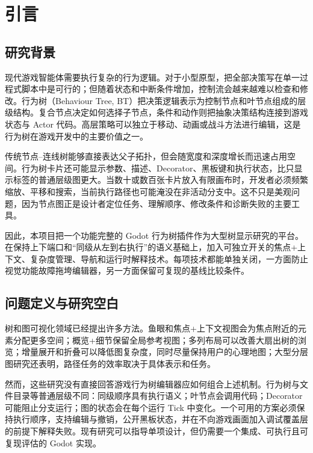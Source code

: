 \chapter{引言}
\label{ch:introduction}

\section{研究背景}

现代游戏智能体需要执行复杂的行为逻辑。对于小型原型，把全部决策写在单一过程式脚本中是可行的；但随着状态和中断条件增加，控制流会越来越难以检查和修改。行为树（Behaviour Tree, BT）把决策逻辑表示为控制节点和叶节点组成的层级结构。复合节点决定如何选择子节点，条件和动作则把抽象决策结构连接到游戏状态与 Actor 代码。高层策略可以独立于移动、动画或战斗方法进行编辑，这是行为树在游戏开发中的主要价值之一\parencite{colledanchise2018bt}。

传统节点--连线树能够直接表达父子拓扑，但会随宽度和深度增长而迅速占用空间。行为树卡片还可能显示参数、描述、Decorator、黑板键和执行状态，比只显示标签的普通层级图更大。当数十或数百张卡片放入有限画布时，开发者必须频繁缩放、平移和搜索，当前执行路径也可能淹没在非活动分支中。这不只是美观问题，因为节点图正是设计者定位任务、理解顺序、修改条件和诊断失败的主要工具。

因此，本项目把一个功能完整的 Godot 行为树插件作为大型树显示研究的平台。在保持上下端口和“同级从左到右执行”的语义基础上，加入可独立开关的焦点+上下文、复杂度管理、导航和运行时解释技术。每项技术都能单独关闭，一方面防止视觉功能故障拖垮编辑器，另一方面保留可复现的基线比较条件。

\section{问题定义与研究空白}

树和图可视化领域已经提出许多方法。鱼眼和焦点+上下文视图会为焦点附近的元素分配更多空间\parencite{furnas1986fisheye,lamping1995hyperbolic}；概览+细节保留全局参考视图\parencite{cockburn2008review}；多列布局可以改善大扇出树的浏览\parencite{song2010largefanout}；增量展开和折叠可以降低图复杂度，同时尽量保持用户的心理地图\parencite{dogrusoz2018complexity,misue1995mentalmap}；大型分层图研究还表明，路径任务的效率取决于具体表示和任务\parencite{bae2011quilts}。

然而，这些研究没有直接回答游戏行为树编辑器应如何组合上述机制。行为树与文件目录等普通层级不同：同级顺序具有执行语义；叶节点会调用代码；Decorator 可能阻止分支运行；图的状态会在每个运行 Tick 中变化。一个可用的方案必须保持执行顺序，支持编辑与撤销，公开黑板状态，并在不向游戏画面加入调试覆盖层的前提下解释失败。现有研究可以指导单项设计，但仍需要一个集成、可执行且可复现评估的 Godot 实现。

